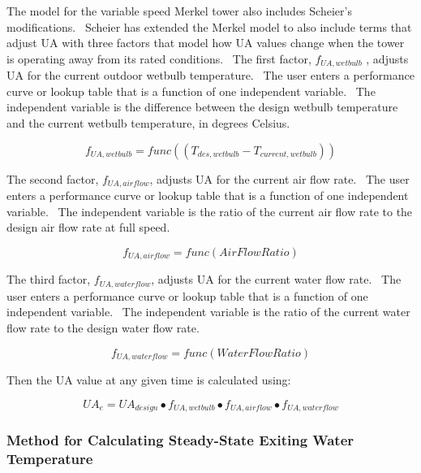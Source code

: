 The model for the variable speed Merkel tower also includes Scheier's modifications.~ Scheier has extended the Merkel model to also include terms that adjust UA with three factors that model how UA values change when the tower is operating away from its rated conditions.~ The first factor, \({f_{UA,wetbulb}}\) , adjusts UA for the current outdoor wetbulb temperature.~ The user enters a performance curve or lookup table that is a function of one independent variable.~ The independent variable is the difference between the design wetbulb temperature and the current wetbulb temperature, in degrees Celsius.

\begin{equation}
{f_{UA,wetbulb}} = func\left( {\left( {{T_{des,wetbulb}} - {T_{current,wetbulb}}} \right)} \right)
\end{equation}

The second factor, \({f_{UA,airflow}}\), adjusts UA for the current air flow rate.~ The user enters a performance curve or lookup table that is a function of one independent variable.~ The independent variable is the ratio of the current air flow rate to the design air flow rate at full speed.

\begin{equation}
{f_{UA,airflow}} = func\left( {AirFlowRatio} \right)
\end{equation}

The third factor, \({f_{UA,waterflow}}\), adjusts UA for the current water flow rate.~ The user enters a performance curve or lookup table that is a function of one independent variable.~ The independent variable is the ratio of the current water flow rate to the design water flow rate.

\begin{equation}
{f_{UA,waterflow}} = func\left( {WaterFlowRatio} \right)
\end{equation}

Then the UA value at any given time is calculated using:

\begin{equation}
U{A_e} = U{A_{design}} \bullet {f_{UA,wetbulb}} \bullet {f_{UA,airflow}} \bullet {f_{UA,waterflow}}
\end{equation}

\subsubsection{Method for Calculating Steady-State Exiting Water Temperature}\label{method-for-calculating-steady-state-exiting-water-temperature}

